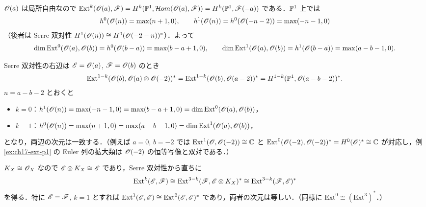 $\mathscr{O}(a)$ は局所自由なので $\mathrm{Ext}^k(\mathscr{O}(a),\mathscr{F})=H^k(\mathbb{P}^1,\mathcal{H}om(\mathscr{O}(a),\mathscr{F}))=H^k(\mathbb{P}^1,\mathscr{F}(-a))$ である．$\mathbb{P}^1$ 上では
\[
h^0(\mathscr{O}(n))=\max(n+1,0),\qquad h^1(\mathscr{O}(n))=h^0(\mathscr{O}(-n-2))=\max(-n-1,0)
\]
（後者は Serre 双対性 $H^1(\mathscr{O}(n))\cong H^0(\mathscr{O}(-2-n))^*$）．よって
\[
\dim\mathrm{Ext}^0(\mathscr{O}(a),\mathscr{O}(b))=h^0(\mathscr{O}(b-a))=\max(b-a+1,0),\qquad
\dim\mathrm{Ext}^1(\mathscr{O}(a),\mathscr{O}(b))=h^1(\mathscr{O}(b-a))=\max(a-b-1,0) .
\]

Serre 双対性の右辺は $\mathscr{E}=\mathscr{O}(a)$, $\mathscr{F}=\mathscr{O}(b)$ のとき
\[
\mathrm{Ext}^{1-k}(\mathscr{O}(b),\mathscr{O}(a)\otimes\mathscr{O}(-2))^*=\mathrm{Ext}^{1-k}(\mathscr{O}(b),\mathscr{O}(a-2))^*=H^{1-k}(\mathbb{P}^1,\mathscr{O}(a-b-2))^* .
\]
$n=a-b-2$ とおくと
\begin{itemize}
\item $k=0$：$h^1(\mathscr{O}(n))=\max(-n-1,0)=\max(b-a+1,0)=\dim\mathrm{Ext}^0(\mathscr{O}(a),\mathscr{O}(b))$，
\item $k=1$：$h^0(\mathscr{O}(n))=\max(n+1,0)=\max(a-b-1,0)=\dim\mathrm{Ext}^1(\mathscr{O}(a),\mathscr{O}(b))$，
\end{itemize}
となり，両辺の次元は一致する．（例えば $a=0$, $b=-2$ では $\mathrm{Ext}^1(\mathscr{O},\mathscr{O}(-2))\cong\mathbb{C}$ と $\mathrm{Ext}^0(\mathscr{O}(-2),\mathscr{O}(-2))^*=H^0(\mathscr{O})^*\cong\mathbb{C}$ が対応し，例 \ref{ex:ch17-ext-p1} の Euler 列の拡大類は $\mathscr{O}(-2)$ の恒等写像と双対である．）

$K_X\cong\mathscr{O}_X$ なので $\mathscr{E}\otimes K_X\cong\mathscr{E}$ であり，Serre 双対性から直ちに
\[
\mathrm{Ext}^k(\mathscr{E},\mathscr{F})\cong\mathrm{Ext}^{3-k}(\mathscr{F},\mathscr{E}\otimes K_X)^*\cong\mathrm{Ext}^{3-k}(\mathscr{F},\mathscr{E})^*
\]
を得る．特に $\mathscr{E}=\mathscr{F}$, $k=1$ とすれば $\mathrm{Ext}^1(\mathscr{E},\mathscr{E})\cong\mathrm{Ext}^2(\mathscr{E},\mathscr{E})^*$ であり，両者の次元は等しい．（同様に $\mathrm{Ext}^0\cong(\mathrm{Ext}^3)^*$．）

